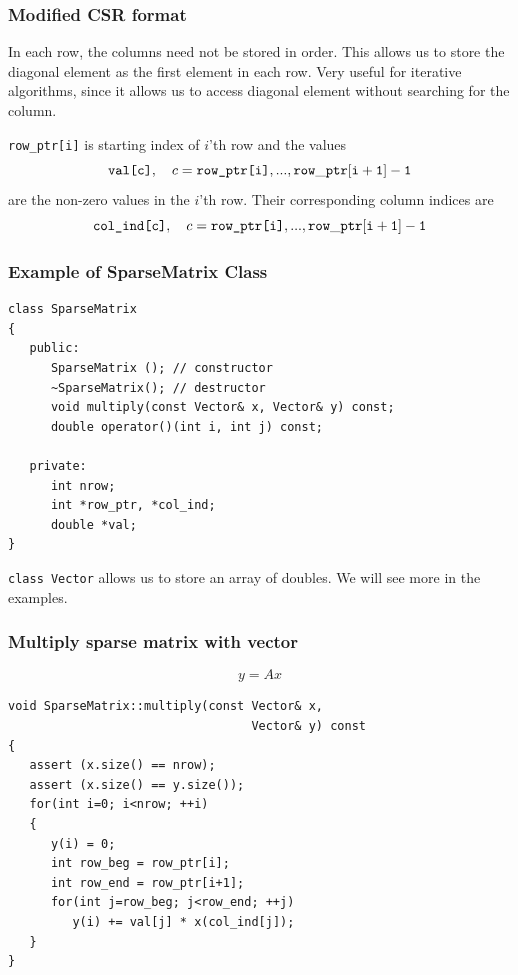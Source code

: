 \documentclass[10pt,xcolor=svgnames]{beamer}
\begin{document}
\begin{frame}
\frametitle{Modified CSR format}
In each row, the columns need not be stored in order. This allows us to store the diagonal element as the first element in each row. Very useful for iterative algorithms, since it allows us to access diagonal element without searching for the column.

{\tt row\_ptr[i]} is starting index of $i$'th row and the values
\[
\textrm{\tt val[c]}, \quad c = \textrm{\tt row\_ptr[i]}, ..., {\tt row\_ptr[i+1]-1}
\]
are the non-zero values in the $i$'th row. Their corresponding column indices are
\[
\textrm{\tt col\_ind[c]}, \quad c = \textrm{\tt row\_ptr[i]}, ..., {\tt row\_ptr[i+1]-1}
\]

\end{frame}
\begin{frame}[fragile]
\frametitle{Example of SparseMatrix Class}

\begin{lstlisting}
class SparseMatrix
{
   public:
      SparseMatrix (); // constructor
      ~SparseMatrix(); // destructor
      void multiply(const Vector& x, Vector& y) const;
      double operator()(int i, int j) const;
      
   private:
      int nrow;
      int *row_ptr, *col_ind;
      double *val;
}
\end{lstlisting}
{\tt class Vector} allows us to store an array of doubles. We will see more in the examples.
\end{frame}
\begin{frame}[fragile]
\frametitle{Multiply sparse matrix with vector}

\[
y = A x
\]

\begin{lstlisting}
void SparseMatrix::multiply(const Vector& x, 
                                  Vector& y) const
{
   assert (x.size() == nrow);
   assert (x.size() == y.size());
   for(int i=0; i<nrow; ++i)
   {
      y(i) = 0;
      int row_beg = row_ptr[i];
      int row_end = row_ptr[i+1];
      for(int j=row_beg; j<row_end; ++j)
         y(i) += val[j] * x(col_ind[j]);
   }
}
\end{lstlisting}

\end{frame}
\end{document}
